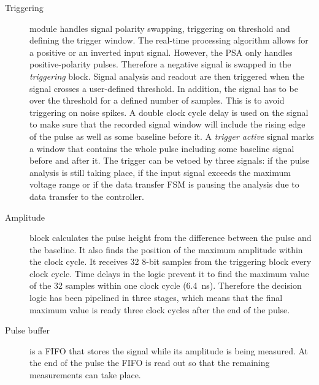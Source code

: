 \documentclass[12pt]{packages/mytustyle}  %
\begin{document}
\begin{description}
\item[Triggering] module handles signal polarity swapping, triggering on threshold and defining the trigger window. The real-time processing algorithm allows for a positive or an inverted input signal. However, the PSA only handles positive-polarity pulses. Therefore a negative signal is swapped in the \textit{triggering} block. Signal analysis and readout are then triggered when the signal crosses a user-defined threshold. In addition, the signal has to be over the threshold for a defined number of samples. This is to avoid triggering on noise spikes.
A double clock cycle delay is used on the signal to make sure that the recorded signal window will include the rising edge of the pulse as well as some baseline before it. A \textit{trigger active} signal marks a window that contains the whole pulse including some baseline signal before and after it. 
The trigger can be vetoed by three signals: if the pulse analysis is still taking place, if the input signal exceeds the maximum voltage range or if the data transfer FSM is pausing the analysis due to data transfer to the controller.

%


\item[Amplitude] block calculates the pulse height from the difference between the pulse and the baseline. It also finds the position of the maximum amplitude within the clock cycle. It receives 32 8-bit samples from the triggering block every clock cycle. Time delays in the logic prevent it to find the maximum value of the 32 samples within one clock cycle (6.4~ns). Therefore the decision logic has been pipelined in three stages, which means that the final maximum value is ready three clock cycles after the end of the pulse.
\item[Pulse buffer] is a FIFO that stores the signal while its amplitude is being measured. At the end of the pulse the FIFO is read out so that the remaining measurements can take place. 


\end{description}
\end{document}
